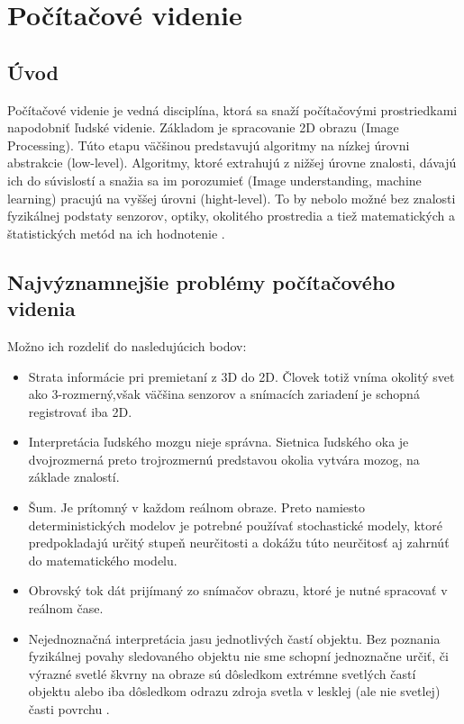 \chapter{Počítačové videnie}
\section{Úvod}
Počítačové videnie je vedná disciplína, ktorá sa snaží počítačovými prostriedkami napodobniť ľudské videnie. Základom je spracovanie 2D obrazu (Image Processing). Túto etapu väčšinou predstavujú algoritmy na nízkej úrovni abstrakcie (low-level). Algoritmy, ktoré extrahujú z nižšej úrovne znalosti, dávajú ich do súvislostí a snažia sa im porozumieť (Image understanding, machine learning) pracujú na vyššej úrovni (hight-level). To by nebolo možné bez znalosti fyzikálnej podstaty senzorov, optiky, okolitého prostredia a tiež matematických a štatistických metód na ich hodnotenie \cite{počítačové_videnie_v_praxi}. 

\section{Najvýznamnejšie problémy počítačového videnia }
Možno ich rozdeliť do nasledujúcich bodov\cite{Analysis_and_Machine_Vision}:
\begin{itemize}
\item Strata informácie pri premietaní z 3D do 2D. Človek totiž vníma okolitý svet ako 3-rozmerný,však väčšina senzorov a snímacích zariadení je schopná registrovať iba 2D.
\item Interpretácia ľudského mozgu nieje správna. Sietnica ľudského oka je dvojrozmerná preto trojrozmernú predstavou okolia vytvára mozog, na základe znalostí.
\item Šum. Je prítomný v každom reálnom obraze. Preto namiesto deterministických modelov je potrebné používať stochastické modely, ktoré predpokladajú určitý stupeň neurčitosti a dokážu túto neurčitosť aj zahrnúť do matematického modelu.
\item Obrovský tok dát prijímaný zo snímačov obrazu, ktoré je nutné spracovať v reálnom čase.
\item Nejednoznačná interpretácia jasu jednotlivých častí objektu. Bez poznania fyzikálnej povahy sledovaného objektu nie sme schopní jednoznačne určiť, či výrazné svetlé škvrny na obraze sú dôsledkom extrémne svetlých častí objektu alebo iba dôsledkom odrazu zdroja svetla v lesklej (ale nie svetlej) časti povrchu \cite{pocitacove_videnie_v_praxi}.
\end{itemize}


